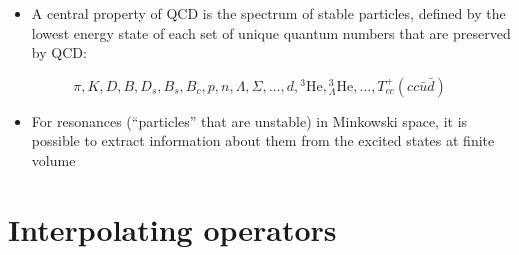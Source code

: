 \newpage

\begin{itemize}
    \item A central property of QCD is the spectrum of stable particles, defined by the lowest energy state of each set of unique quantum numbers that are preserved by QCD:
\end{itemize}
\begin{equation}
    \pi, K, D, B, D_s, B_s, B_c, p, n, \Lambda, \Sigma, \ldots, d, {}^3\text{He}, {}^3_\Lambda\text{He}, \ldots, T_{cc}^+(cc \bar{u}\bar{d})
\end{equation}
\begin{itemize}
    \item For resonances (``particles'' that are unstable) in Minkowski space, it is possible to extract information about them from the excited states at finite volume
\end{itemize}

\section{Interpolating operators}

